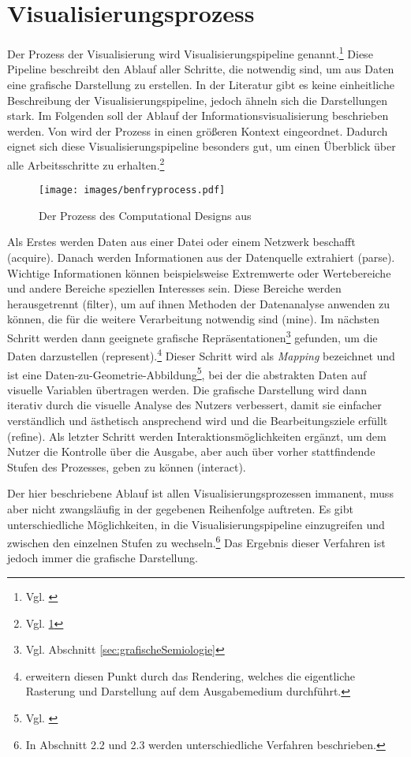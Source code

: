 \documentclass[a4paper, 
               12pt,
               DIV=calc,
               version=first,
               pdftex,
               headsepline,
               footsepline,
               bibtotocnumbered,
               liststotocnumbered]{scrreprt}
\begin{document}
\section{Visualisierungsprozess}
\label{sec:Pipeline}
Der Prozess der Visualisierung wird Visualisierungspipeline genannt.\footnote{Vgl. \citep[S.\,15]{Schumann}}
Diese Pipeline beschreibt den Ablauf aller
Schritte, die notwendig sind, um aus Daten eine grafische Darstellung zu erstellen. In der Literatur gibt es keine einheitliche
Beschreibung der Visualisierungspipeline, jedoch ähneln sich die Darstellungen stark.
Im Folgenden soll der Ablauf der Informationsvisualisierung
beschrieben werden. Von \cite{BenFry} wird der Prozess in einen
größeren Kontext eingeordnet. Dadurch eignet sich diese
Visualisierungspipeline besonders gut, um einen Überblick über alle Arbeitsschritte zu erhalten.\footnote{Vgl. \ref{fig:benfryprocess}}
\begin{figure}
\centering
\texttt{[image: images/benfryprocess.pdf]}
\caption{Der Prozess des Computational Designs aus \cite[S.\,13]{BenFry}}
\label{fig:benfryprocess}
\end{figure}
Als Erstes werden Daten aus einer Datei oder einem Netzwerk
beschafft (acquire). Danach werden Informationen aus der Datenquelle extrahiert (parse).
Wichtige Informationen können beispielsweise Extremwerte oder Wertebereiche und andere Bereiche speziellen
Interesses sein.
Diese Bereiche werden herausgetrennt (filter), um auf ihnen Methoden der Datenanalyse anwenden zu können,
die für die weitere Verarbeitung notwendig sind (mine). Im nächsten Schritt werden dann geeignete
grafische Repräsentationen\footnote{Vgl. Abschnitt \ref{sec:grafischeSemiologie}} gefunden, um die Daten
darzustellen (represent).\footnote{\cite{Schumann} erweitern diesen Punkt durch das Rendering, welches die eigentliche Rasterung
und Darstellung auf dem Ausgabemedium durchführt.}
Dieser Schritt wird als \textit{Mapping} bezeichnet und ist eine
Daten-zu-Geometrie-Abbildung\footnote{Vgl. \citep[S.\,16]{Schumann}}, bei der
die abstrakten Daten auf visuelle Variablen übertragen werden.
Die grafische Darstellung wird dann iterativ durch die visuelle Analyse des Nutzers
verbessert, damit sie einfacher verständlich und ästhetisch ansprechend wird und die Bearbeitungsziele erfüllt (refine). Als letzter
Schritt werden Interaktionsmöglichkeiten ergänzt, um dem Nutzer die Kontrolle über die
Ausgabe, aber auch über vorher stattfindende Stufen des Prozesses, geben zu können (interact).

Der hier beschriebene Ablauf ist allen Visualisierungsprozessen immanent, muss aber nicht zwangsläufig
in der gegebenen Reihenfolge auftreten. Es gibt unterschiedliche Möglichkeiten, in die
Visualisierungspipeline einzugreifen und zwischen den einzelnen Stufen zu wechseln.\footnote{In
\citep{Schumann} Abschnitt 2.2 und 2.3 werden unterschiedliche Verfahren beschrieben.}
Das Ergebnis dieser Verfahren ist jedoch immer die grafische Darstellung.
\newpage
\end{document}
